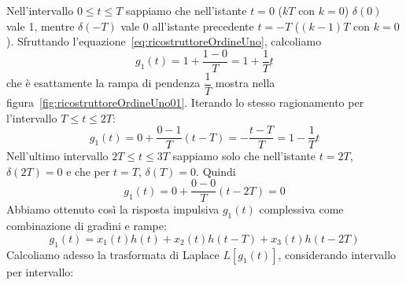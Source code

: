 \documentclass[a4paper]{report}
\begin{document}
Nell'intervallo $0 \leq t \leq T$ sappiamo che nell'istante $t = 0$
($kT$ con $k = 0$) $\delta(0)$ vale 1, mentre $\delta(-T)$ vale
0 all'istante precedente $t = -T$ ($(k - 1)T$ con $k = 0$). Sfruttando
l'equazione~\ref{eq:ricostruttoreOrdineUno}, calcoliamo
\[
g_1(t) = 1 + \dfrac{1 - 0}{T} = 1 + \dfrac{1}{T}t
\]
che \`e esattamente la rampa di pendenza $\dfrac{1}{T}$ mostra nella
figura~\ref{fig:ricostruttoreOrdineUno01}. Iterando lo stesso
ragionamento per l'intervallo $T \leq t \leq 2T$:
\[
g_1(t) = 0 + \dfrac{0 - 1}{T} (t - T) = - \dfrac{t - T}{T} = 1 -
\dfrac{1}{T}t
\]
Nell'ultimo intervallo $2T \leq t \leq 3T$ sappiamo solo che
nell'istante $t = 2T$, $\delta(2T) = 0$ e che per $t = T$, $\delta(T)
= 0$. Quindi
\[
g_1(t) = 0 + \dfrac{0 - 0}{T} (t - 2T) = 0
\]
Abbiamo ottenuto cos\`i la risposta impulsiva $g_1(t)$ complessiva
come combinazione di gradini e rampe:
\[
g_1(t) = x_1(t)h(t) + x_2(t)h(t - T) + x_3(t)h(t - 2T)
\]
Calcoliamo adesso la trasformata di Laplace $L[g_1(t)]$, considerando
intervallo per intervallo:
\end{document}
